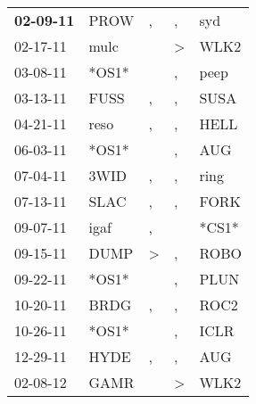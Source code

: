\begin{supertabular}{p{0.07\textwidth}p{0.06\textwidth}p{0.02\textwidth}p{0.02\textwidth}p{0.06\textwidth}}
 \textbf{02-09-11\textsuperscript{}} &           PROW\textsuperscript{} &                , &             , &            syd\textsuperscript{} \\
          02-17-11\textsuperscript{} &           mulc\textsuperscript{} &                  &  \textgreater &           WLK2\textsuperscript{} \\
          03-08-11\textsuperscript{} &                            *OS1* &                  &             , &           peep\textsuperscript{} \\
          03-13-11\textsuperscript{} &           FUSS\textsuperscript{} &                , &             , &           SUSA\textsuperscript{} \\
          04-21-11\textsuperscript{} &           reso\textsuperscript{} &                , &             , &           HELL\textsuperscript{} \\
          06-03-11\textsuperscript{} &                            *OS1* &                  &             , &            AUG\textsuperscript{} \\
          07-04-11\textsuperscript{} &           3WID\textsuperscript{} &                , &             , &           ring\textsuperscript{} \\
          07-13-11\textsuperscript{} &           SLAC\textsuperscript{} &                , &             , &           FORK\textsuperscript{} \\
          09-07-11\textsuperscript{} &           igaf\textsuperscript{} &                , &               &                            *CS1* \\
          09-15-11\textsuperscript{} &           DUMP\textsuperscript{} &     \textgreater &             , &           ROBO\textsuperscript{} \\
          09-22-11\textsuperscript{} &                            *OS1* &                  &             , &           PLUN\textsuperscript{} \\
          10-20-11\textsuperscript{} &           BRDG\textsuperscript{} &                , &             , &           ROC2\textsuperscript{} \\
          10-26-11\textsuperscript{} &                            *OS1* &                  &             , &           ICLR\textsuperscript{} \\
          12-29-11\textsuperscript{} &           HYDE\textsuperscript{} &                , &             , &            AUG\textsuperscript{} \\
          02-08-12\textsuperscript{} &           GAMR\textsuperscript{} &                  &  \textgreater &           WLK2\textsuperscript{} \\

\end{supertabular}
